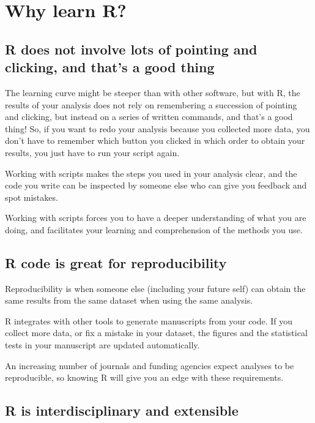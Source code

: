 \documentclass[]{book}
\begin{document}
\section{Why learn R?}\label{why-learn-r}

\subsection{R does not involve lots of pointing and clicking, and that's
a good
thing}\label{r-does-not-involve-lots-of-pointing-and-clicking-and-thats-a-good-thing}

The learning curve might be steeper than with other software, but with
R, the results of your analysis does not rely on remembering a
succession of pointing and clicking, but instead on a series of written
commands, and that's a good thing! So, if you want to redo your analysis
because you collected more data, you don't have to remember which button
you clicked in which order to obtain your results, you just have to run
your script again.

Working with scripts makes the steps you used in your analysis clear,
and the code you write can be inspected by someone else who can give you
feedback and spot mistakes.

Working with scripts forces you to have a deeper understanding of what
you are doing, and facilitates your learning and comprehension of the
methods you use.

\subsection{R code is great for
reproducibility}\label{r-code-is-great-for-reproducibility}

Reproducibility is when someone else (including your future self) can
obtain the same results from the same dataset when using the same
analysis.

R integrates with other tools to generate manuscripts from your code. If
you collect more data, or fix a mistake in your dataset, the figures and
the statistical tests in your manuscript are updated automatically.

An increasing number of journals and funding agencies expect analyses to
be reproducible, so knowing R will give you an edge with these
requirements.

\subsection{R is interdisciplinary and
extensible}\label{r-is-interdisciplinary-and-extensible}
\end{document}
